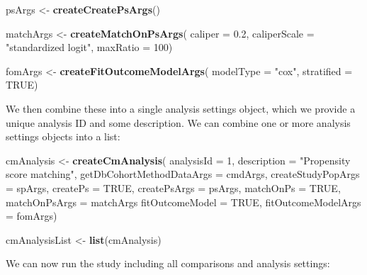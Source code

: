 \documentclass[
  11pt]{book}
\newenvironment{Shaded}{\begin{snugshade}}{\end{snugshade}}
\newcommand{\AttributeTok}[1]{\textcolor[rgb]{0.13,0.29,0.53}{#1}}
\newcommand{\ConstantTok}[1]{\textcolor[rgb]{0.56,0.35,0.01}{#1}}
\newcommand{\DecValTok}[1]{\textcolor[rgb]{0.00,0.00,0.81}{#1}}
\newcommand{\FloatTok}[1]{\textcolor[rgb]{0.00,0.00,0.81}{#1}}
\newcommand{\FunctionTok}[1]{\textcolor[rgb]{0.13,0.29,0.53}{\textbf{#1}}}
\newcommand{\NormalTok}[1]{#1}
\newcommand{\OtherTok}[1]{\textcolor[rgb]{0.56,0.35,0.01}{#1}}
\newcommand{\StringTok}[1]{\textcolor[rgb]{0.31,0.60,0.02}{#1}}
\theoremstyle{definition}
\theoremstyle{definition}
\theoremstyle{definition}
\theoremstyle{definition}
\theoremstyle{remark}
\begin{document}
\begin{Shaded}
\begin{Highlighting}[]
\NormalTok{psArgs }\OtherTok{\textless{}{-}} \FunctionTok{createCreatePsArgs}\NormalTok{()}

\NormalTok{matchArgs }\OtherTok{\textless{}{-}} \FunctionTok{createMatchOnPsArgs}\NormalTok{(}
  \AttributeTok{caliper =} \FloatTok{0.2}\NormalTok{,}
  \AttributeTok{caliperScale =} \StringTok{"standardized logit"}\NormalTok{,}
  \AttributeTok{maxRatio =} \DecValTok{100}\NormalTok{)}

\NormalTok{fomArgs }\OtherTok{\textless{}{-}} \FunctionTok{createFitOutcomeModelArgs}\NormalTok{(}
  \AttributeTok{modelType =} \StringTok{"cox"}\NormalTok{,}
  \AttributeTok{stratified =} \ConstantTok{TRUE}\NormalTok{)}
\end{Highlighting}
\end{Shaded}

We then combine these into a single analysis settings object, which we provide a unique analysis ID and some description. We can combine one or more analysis settings objects into a list:

\begin{Shaded}
\begin{Highlighting}[]
\NormalTok{cmAnalysis }\OtherTok{\textless{}{-}} \FunctionTok{createCmAnalysis}\NormalTok{(}
  \AttributeTok{analysisId =} \DecValTok{1}\NormalTok{,}
  \AttributeTok{description =} \StringTok{"Propensity score matching"}\NormalTok{,}
  \AttributeTok{getDbCohortMethodDataArgs =}\NormalTok{ cmdArgs,}
  \AttributeTok{createStudyPopArgs =}\NormalTok{ spArgs,}
  \AttributeTok{createPs =} \ConstantTok{TRUE}\NormalTok{,}
  \AttributeTok{createPsArgs =}\NormalTok{ psArgs,}
  \AttributeTok{matchOnPs =} \ConstantTok{TRUE}\NormalTok{,}
  \AttributeTok{matchOnPsArgs =}\NormalTok{ matchArgs}
  \AttributeTok{fitOutcomeModel =} \ConstantTok{TRUE}\NormalTok{,}
  \AttributeTok{fitOutcomeModelArgs =}\NormalTok{ fomArgs)}

\NormalTok{cmAnalysisList }\OtherTok{\textless{}{-}} \FunctionTok{list}\NormalTok{(cmAnalysis)}
\end{Highlighting}
\end{Shaded}

We can now run the study including all comparisons and analysis settings:
\end{document}
